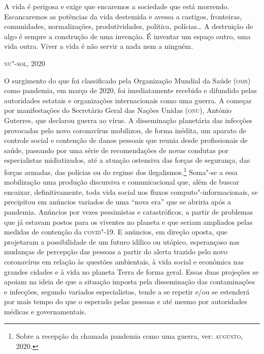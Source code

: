
\epigraph{A vida é perigosa e exige que encaremos a sociedade que está
morrendo. Escancaremos as potências da vida destemida e avessa a
castigos, fronteiras, comunidades, normalizações, produtividades,
política, polícias\ldots{} A destruição de algo é sempre a construção de
uma invenção. É inventar um espaço outro, uma vida outra. Viver a vida é
não servir a nada nem a ninguém.}{\textsc{nu"-sol}, 2020}

O surgimento do que foi classificado pela Organização Mundial da Saúde
(\textsc{oms}) como pandemia, em março de 2020, foi imediatamente recebido e
difundido pelas autoridades estatais e organizações internacionais como
uma guerra. A começar por manifestações do Secretário Geral das Nações
Unidas (\textsc{onu}), António Guterres, que declarou guerra ao vírus. A
disseminação planetária das infecções provocadas pelo novo coronavírus
mobilizou, de forma inédita, um aparato de controle social e contenção
de danos pessoais que reunia desde profissionais de saúde, passando por
uma série de recomendações de novas condutas por especialistas
midiatizados, até a atuação ostensiva das forças de segurança, das
forças armadas, das polícias ou do regime dos ilegalismos.\footnote{Sobre
  a recepção da chamada pandemia como uma guerra, ver: \textsc{augusto}, 2020.}
Soma"-se a essa mobilização uma produção discursiva e comunicacional que,
além de buscar encaixar, definitivamente, toda vida social nos fluxos
computo"-informacionais, se precipitou em anúncios variados de uma ``nova
era'' que se abriria após a pandemia. Anúncios por vezes pessimistas e
catastróficos, a partir de problemas que já estavam postos para os
viventes no planeta e que seriam ampliados pelas medidas de contenção da
\textsc{covid}"-19. E anúncios, em direção oposta, que projetaram a possibilidade
de um futuro idílico ou utópico, esperançoso nas mudanças de percepção
das pessoas a partir do alerta trazido pelo novo coronavírus em relação
às questões ambientais, à vida social e econômica nas grandes cidades e
à vida no planeta Terra de forma geral. Essas duas projeções se apoiam
na ideia de que a situação imposta pela disseminação das contaminações e
infecções, segundo variados especialistas, tende a se repetir e/ou se
estenderá por mais tempo do que o esperado pelas pessoas e até mesmo por
autoridades médicas e governamentais.

